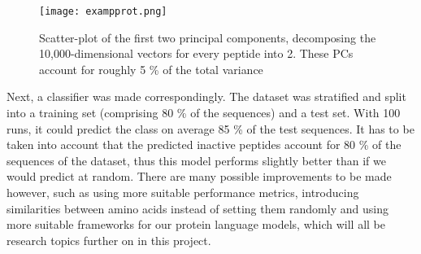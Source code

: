 \begin{figure}[H]
    \centering
    \texttt{[image: exampprot.png]}
    \caption{Scatter-plot of the first two principal components, decomposing the 10,000-dimensional vectors for every peptide into 2. These PCs account for roughly 5 \% of the total variance}
    \label{fig:diagram_exprot}
\end{figure}

Next, a classifier was made correspondingly. The dataset was stratified and split into a training set (comprising 80 \% of the sequences) and a test set. With 100 runs, it could predict the class on average 85 \% of the test sequences. It has to be taken into account that the predicted inactive peptides account for 80 \% of the sequences of the dataset, thus this model performs slightly better than if we would predict at random. There are many possible improvements to be made however, such as using more suitable performance metrics, introducing similarities between amino acids instead of setting them randomly and using more suitable frameworks for our protein language models, which will all be research topics further on in this project.